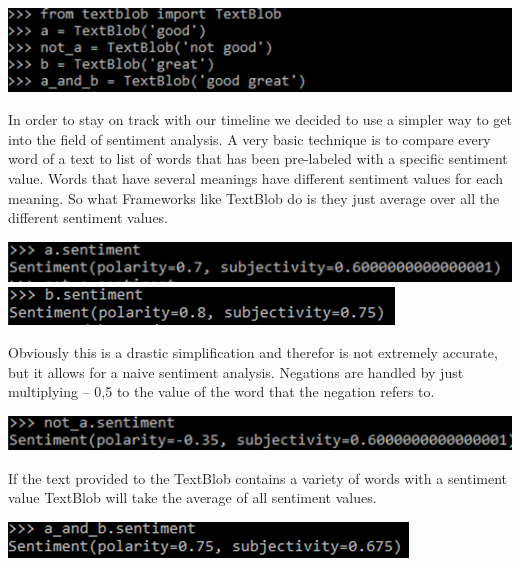 \documentclass[
    fontsize=12pt,
    headings=small,
    parskip=half,           %
    bibliography=totoc,
    numbers=noenddot,       %
    open=any,               %
    ]{scrreprt}
\begin{document}
\includegraphics[]{basic_usage.png}

In order to stay on track with our timeline we decided to use a simpler way to get into the field of sentiment analysis.
A very basic technique is to compare every word of a text to list of words that has been pre-labeled with a specific sentiment value. Words that have several meanings have different sentiment values for each meaning. So what Frameworks like TextBlob do is they just average over all the different sentiment values. \\

\begin{center}
    \includegraphics[]{a.png}\\
    \includegraphics[]{b.png}
\end{center}

Obviously this is a drastic simplification and therefor is not extremely accurate, but it allows for a naive sentiment analysis. Negations are handled by just multiplying – 0,5 to the value of the word that the negation refers to.\\

\begin{center}
    \includegraphics[]{not_a.png}
\end{center}

If the text provided to the TextBlob contains a variety of words with a sentiment value TextBlob will take the average of all sentiment values. 

\begin{center}
    \includegraphics[]{a_and_b.png}
\end{center}
 
\end{document}
